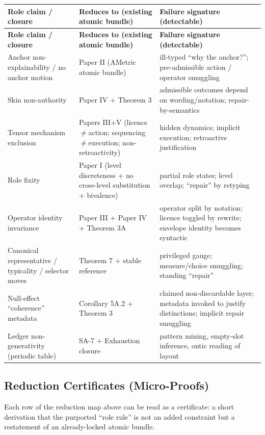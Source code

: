\documentclass[12pt]{article}
\theoremstyle{plain}
\begin{document}
\renewcommand{\arraystretch}{1.15}
\begin{longtable}{@{}p{}p{}p{}@{}}
\toprule
\textbf{Role claim / closure} & \textbf{Reduces to (existing atomic bundle)} & \textbf{Failure signature (detectable)}\\
\midrule
\endfirsthead
\toprule
\textbf{Role claim / closure} & \textbf{Reduces to (existing atomic bundle)} & \textbf{Failure signature (detectable)}\\
\midrule
\endhead
Anchor non-explainability / no anchor motion & Paper II (AMetric atomic bundle) & ill-typed ``why the anchor?''; pre-admissible action / operator smuggling \\
Skin non-authority & Paper IV + Theorem 3 & admissible outcomes depend on wording/notation; repair-by-semantics \\
Tensor mechanism exclusion & Papers III+V (licence$\neq$action; sequencing$\neq$execution; non-retroactivity) & hidden dynamics; implicit execution; retroactive justification \\
Role fixity & Paper I (level discreteness + no cross-level substitution + bivalence) & partial role states; level overlap; ``repair'' by retyping \\
Operator identity invariance & Paper III + Paper IV + Theorem 3A & operator split by notation; licence toggled by rewrite; envelope identity becomes syntactic \\
Canonical representative / typicality / selector moves & Theorem 7 + stable reference & privileged gauge; measure/choice smuggling; standing ``repair'' \\
Null-effect ``coherence'' metadata & Corollary 5A.2 + Theorem 3 & claimed non-discardable layer; metadata invoked to justify distinctions; implicit repair smuggling \\

Ledger non-generativity (periodic table) & SA-7 + Exhaustion closure & pattern mining, empty-slot inference, ontic reading of layout \\
\bottomrule
\end{longtable}

\subsection{Reduction Certificates (Micro-Proofs)}

Each row of the reduction map above can be read as a certificate: a short derivation that the purported ``role rule'' is not an added constraint but a restatement of an already-locked atomic bundle.
\end{document}
